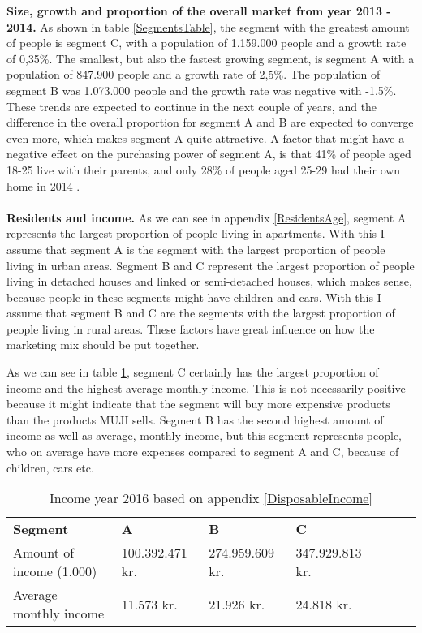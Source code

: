 \textbf{Size, growth and proportion of the overall market from year 2013 - 2014.}
As shown in table \ref{SegmentsTable}, the segment with the greatest amount of people is segment C, with a population of 1.159.000 people and a growth rate of 0,35\%. The smallest, but also the fastest growing segment, is segment A with a population of 847.900 people and a growth rate of 2,5\%. The population of segment B was 1.073.000 people and the growth rate was negative with -1,5\%. These trends are expected to continue in the next couple of years, and the difference in the overall proportion for segment A and B are expected to converge even more, which makes segment A quite attractive. A factor that might have a negative effect on the purchasing power of segment A, is that 41\% of people aged 18-25 live with their parents, and only 28\% of people aged 25-29 had their own home in 2014 \cite[12]{ConsumerLifestyles}.
\\\\
\textbf{Residents and income.} As we can see in appendix \ref{ResidentsAge}, segment A represents the largest proportion of people living in apartments. With this I assume that segment A is the segment with the largest proportion of people living in urban areas. Segment B and C represent the largest proportion of people living in detached houses and linked or semi-detached houses, which makes sense, because people in these segments might have children and cars. With this I assume that segment B and C are the segments with the largest proportion of people living in rural areas. These factors have great influence on how the marketing mix should be put together. \par

\forceindent As we can see in table \ref{DisposableIncomeTable}, segment C certainly has the largest proportion of income and the highest average monthly income. This is not necessarily positive because it might indicate that the segment will buy more expensive products than the products MUJI sells. Segment B has the second highest amount of income as well as average, monthly income, but this segment represents people, who on average have more expenses compared to segment A and C, because of children, cars etc. 

\begin{table}[H]
\centering
\caption{Income year 2016 based on appendix \ref{DisposableIncome}}
\label{DisposableIncomeTable}
\begin{tabular}{lllllll}
\multicolumn{1}{l|}{\textbf{Segment}}         & \textbf{A}      & \textbf{B}      & \textbf{C}      &  &  &  \\ \cline{1-4}
\multicolumn{1}{l|}{Amount of income (1.000)} & 100.392.471 kr. & 274.959.609 kr. & 347.929.813 kr. &  &  &  \\
\multicolumn{1}{l|}{Average monthly income}   & 11.573 kr.      & 21.926 kr.      & 24.818 kr.      &  &  &  
\end{tabular}
\end{table}

